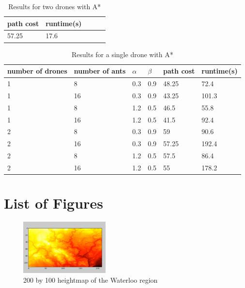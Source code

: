 \documentclass[conference]{IEEEtran}
\begin{document}
\begin{table}[H]
\centering
\begin{tabular}{ | m{1cm} | m{1cm}| m{1cm} | m{1.5cm} | m{1.5cm} |} 
\hline
path cost & runtime(s) \\ 
\hline
57.25 & 17.6 \\
\hline
\end{tabular}
\caption{Results for two drones with A*} \label{tab:double_a}
\end{table}

\begin{table}[H]
\centering
\begin{tabular}{ | m{1cm} | m{1cm}| m{1cm} | m{1.5cm} | m{1.5cm} | m{1.5cm}} 
\hline
number of drones & number of ants & $\alpha$ & $\beta$ & path cost & runtime(s) \\ 
\hline
1 & 8 & 0.3 & 0.9 & 48.25 & 72.4 \\
\hline
1 & 16 & 0.3 & 0.9 & 43.25 & 101.3 \\ 
\hline
1 & 8 & 1.2 & 0.5 & 46.5 & 55.8 \\
\hline
1 & 16 & 1.2 & 0.5 & 41.5 & 92.4 \\
\hline
2 & 8 & 0.3 & 0.9 & 59 & 90.6 \\
\hline
2 & 16 & 0.3 & 0.9 & 57.25 & 192.4 \\ 
\hline
2 & 8 & 1.2 & 0.5 & 57.5 & 86.4 \\
\hline
2 & 16 & 1.2 & 0.5 & 55 & 178.2 \\
\hline
\end{tabular}
\caption{Results for a single drone with A*} \label{tab:random}
\end{table}

\newpage
\phantom{Blah}
\newpage

\section{List of Figures}
\begin{figure}[H]
\centerline{\includegraphics[width=0.4\textwidth]{images/heightmap_orig.png}}
\caption{200 by 100 heightmap of the Waterloo region}
\label{img:heightmap1}
\end{figure}
\end{document}
